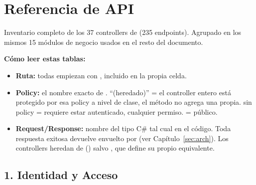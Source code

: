 \chapter{Referencia de API}
\label{sec:api-reference}

Inventario completo de los 37 controllers de \allowbreak {}\allowbreak {}\allowbreak {}\allowbreak {} (235 endpoints). Agrupado en los mismos 15 módulos de negocio usados en el resto del documento.

\textbf{Cómo leer estas tablas:}
\begin{itemize}
  \item \textbf{Ruta:} todas empiezan con , incluido en la propia celda.
  \item \textbf{Policy:} el nombre exacto de \code{[Authorize(Policy = "...")]}. ``(heredado)'' = el controller entero está protegido por esa policy a nivel de clase, el método no agrega una propia. \code{[Authorize]} sin policy = requiere estar autenticado, cualquier permiso.  = público.
  \item \textbf{Request/Response:} nombre del tipo C\# tal cual en el código. Toda respuesta exitosa devuelve  envuelto por  (ver Capítulo~\ref{sec:arch}). Los controllers heredan de  () salvo \allowbreak {}, que define su propio  equivalente.
\end{itemize}

\section{1. Identidad y Acceso}
\label{sec:api-identidad}

